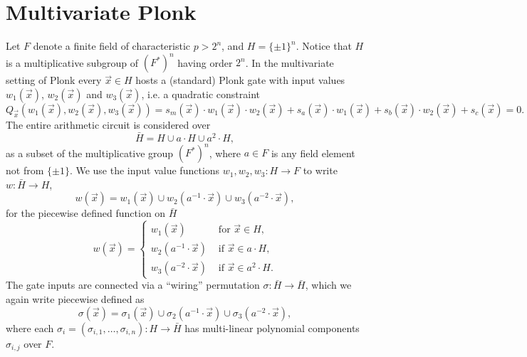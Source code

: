 \documentclass[11pt]{article}
\theoremstyle{definition}
\theoremstyle{remark}
\begin{document}
\section{Multivariate Plonk}

Let $F$ denote a finite field of characteristic $p > 2^n$, and $H= \{\pm 1\}^n$. 
Notice that $H$ is a multiplicative subgroup of $(F^*)^n$ having order $2^n$. 
%
In the multivariate setting of Plonk  every $\vec x \in H$ hosts a (standard) Plonk gate with input values $w_1(\vec x)$, $w_2(\vec x)$ and $w_3(\vec x)$, i.e. a quadratic constraint
\begin{equation}
\label{e:QuadraticConstraint}
Q_{\vec x}(w_1(\vec x), w_2(\vec x), w_3(\vec x) ) = s_m(\vec x)\cdot w_1(\vec x) \cdot w_2(\vec x) + s_a(\vec x) \cdot w_1(\vec x) + s_b(\vec x)\cdot w_2(\vec x) + s_c(\vec x) = 0.
\end{equation}
The entire arithmetic circuit is considered over
\begin{equation}
\bar H = H\cup a\cdot H \cup a^2 \cdot H,
\end{equation}
as a subset of the multiplicative group $(F^*)^n$, where $a\in F$ is any field element not from $\{\pm 1\}$.
We use the input value functions $w_1, w_2, w_3: H\longrightarrow F$ to write $w: \bar H\longrightarrow H$,  
\begin{equation}
w(\vec x) = w_1(\vec x) \cup w_2( a^{-1}\cdot \vec x) \cup w_3(a^{-2}\cdot \vec x), 
\end{equation}
for the piecewise defined function on $\bar H$
\[
w(\vec x) = 
\begin{cases}
w_1(\vec x) & \text{ for }\vec x\in H,
\\
w_2(a^{-1}\cdot\vec x) & \text{ if } \vec x \in a\cdot H,
\\
w_3(a^{-2}\cdot\vec x) & \text{ if } \vec x \in a^2\cdot H.
\end{cases}
\]
The gate inputs are connected via a ``wiring'' permutation $\sigma: \bar H\rightarrow \bar H$, which we again write piecewise defined as 
\begin{equation}
\sigma(\vec x) = \sigma_1(\vec x) \cup \sigma_2(a^{-1}\cdot \vec x) \cup \sigma_3(a^{-2}\cdot \vec x),
\end{equation}
where each $\sigma_i = (\sigma_{i,1}, \ldots, \sigma_{i,n}): H \longrightarrow \bar H$ has multi-linear polynomial components $\sigma_{i,j}$ over $F$.
\end{document}
